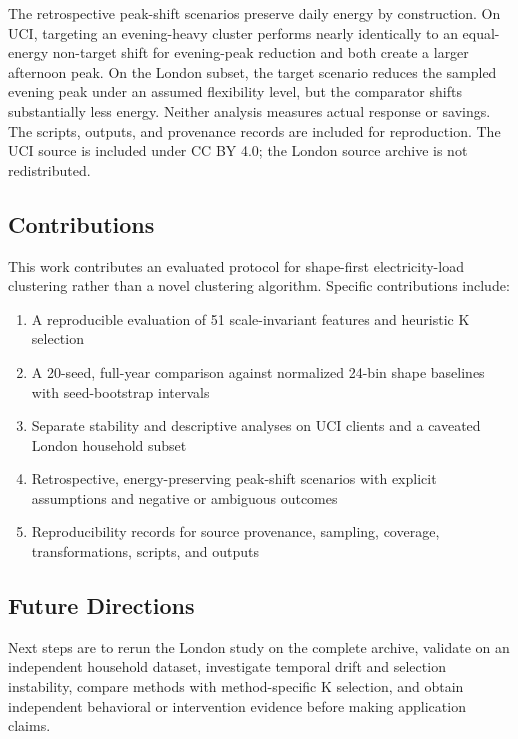 \documentclass[11pt,a4paper]{article}
\begin{document}
The retrospective peak-shift scenarios preserve daily energy by construction. On UCI, targeting an evening-heavy cluster performs nearly identically to an equal-energy non-target shift for evening-peak reduction and both create a larger afternoon peak. On the London subset, the target scenario reduces the sampled evening peak under an assumed flexibility level, but the comparator shifts substantially less energy. Neither analysis measures actual response or savings. The scripts, outputs, and provenance records are included for reproduction. The UCI source is included under CC BY 4.0; the London source archive is not redistributed.

\subsection{Contributions}

This work contributes an evaluated protocol for shape-first electricity-load clustering rather than a novel clustering algorithm. Specific contributions include:

\begin{enumerate}
    \item A reproducible evaluation of 51 scale-invariant features and heuristic K selection
    \item A 20-seed, full-year comparison against normalized 24-bin shape baselines with seed-bootstrap intervals
    \item Separate stability and descriptive analyses on UCI clients and a caveated London household subset
    \item Retrospective, energy-preserving peak-shift scenarios with explicit assumptions and negative or ambiguous outcomes
    \item Reproducibility records for source provenance, sampling, coverage, transformations, scripts, and outputs
\end{enumerate}

\subsection{Future Directions}

Next steps are to rerun the London study on the complete archive, validate on an independent household dataset, investigate temporal drift and selection instability, compare methods with method-specific K selection, and obtain independent behavioral or intervention evidence before making application claims.
\end{document}
